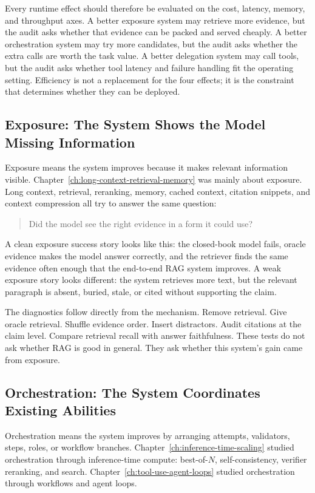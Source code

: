 Every runtime effect should therefore be evaluated on the cost, latency, memory, and throughput axes. A better exposure system may retrieve more evidence, but the audit asks whether that evidence can be packed and served cheaply. A better orchestration system may try more candidates, but the audit asks whether the extra calls are worth the task value. A better delegation system may call tools, but the audit asks whether tool latency and failure handling fit the operating setting. Efficiency is not a replacement for the four effects; it is the constraint that determines whether they can be deployed.

\subsection{Exposure: The System Shows the Model Missing Information}

Exposure means the system improves because it makes relevant information visible. Chapter~\ref{ch:long-context-retrieval-memory} was mainly about exposure. Long context, retrieval, reranking, memory, cached context, citation snippets, and context compression all try to answer the same question:

\begin{quote}
Did the model see the right evidence in a form it could use?
\end{quote}

A clean exposure success story looks like this: the closed-book model fails, oracle evidence makes the model answer correctly, and the retriever finds the same evidence often enough that the end-to-end RAG system improves. A weak exposure story looks different: the system retrieves more text, but the relevant paragraph is absent, buried, stale, or cited without supporting the claim.

The diagnostics follow directly from the mechanism. Remove retrieval. Give oracle retrieval. Shuffle evidence order. Insert distractors. Audit citations at the claim level. Compare retrieval recall with answer faithfulness. These tests do not ask whether RAG is good in general. They ask whether this system's gain came from exposure.

\subsection{Orchestration: The System Coordinates Existing Abilities}

Orchestration means the system improves by arranging attempts, validators, steps, roles, or workflow branches. Chapter~\ref{ch:inference-time-scaling} studied orchestration through inference-time compute: best-of-$N$, self-consistency, verifier reranking, and search. Chapter~\ref{ch:tool-use-agent-loops} studied orchestration through workflows and agent loops.


